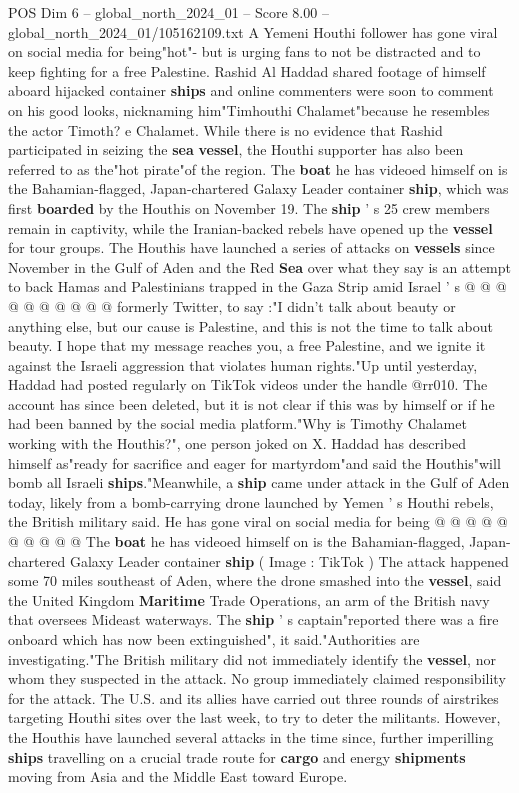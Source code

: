 \begin{textsample}{POS Dim 6 – global\_north\_2024\_01 – Score 8.00 – global\_north\_2024\_01/105162109.txt}  \label{ex:f6_pos_113}
A Yemeni Houthi follower has gone viral on social media for being"hot"- but is urging fans to not be distracted and to keep fighting for a free Palestine.
Rashid Al Haddad shared footage of himself aboard hijacked container \textbf{ships} and online commenters were soon to comment on his good looks, nicknaming him"Timhouthi Chalamet"because he resembles the actor Timoth? e Chalamet.
While there is no evidence that Rashid participated in seizing the \textbf{sea} \textbf{vessel}, the Houthi supporter has also been referred to as the"hot pirate"of the region.
The \textbf{boat} he has videoed himself on is the Bahamian-flagged, Japan-chartered Galaxy Leader container \textbf{ship}, which was first \textbf{boarded} by the Houthis on November 19.
The \textbf{ship} ' s 25 crew members remain in captivity, while the Iranian-backed rebels have opened up the \textbf{vessel} for tour groups.
The Houthis have launched a series of attacks on \textbf{vessels} since November in the Gulf of Aden and the Red \textbf{Sea} over what they say is an attempt to back Hamas and Palestinians trapped in the Gaza Strip amid Israel ' s @ @ @ @ @ @ @ @ @ @ formerly Twitter, to say :"I didn't talk about beauty or anything else, but our cause is Palestine, and this is not the time to talk about beauty.
I hope that my message reaches you, a free Palestine, and we ignite it against the Israeli aggression that violates human rights."Up until yesterday, Haddad had posted regularly on TikTok videos under the handle @rr010.
The account has since been deleted, but it is not clear if this was by himself or if he had been banned by the social media platform."Why is Timothy Chalamet working with the Houthis?", one person joked on X.
Haddad has described himself as"ready for sacrifice and eager for martyrdom"and said the Houthis"will bomb all Israeli \textbf{ships}."Meanwhile, a \textbf{ship} came under attack in the Gulf of Aden today, likely from a bomb-carrying drone launched by Yemen ' s Houthi rebels, the British military said.
He has gone viral on social media for being @ @ @ @ @ @ @ @ @ @ The \textbf{boat} he has videoed himself on is the Bahamian-flagged, Japan-chartered Galaxy Leader container \textbf{ship} ( Image : TikTok ) The attack happened some 70 miles southeast of Aden, where the drone smashed into the \textbf{vessel}, said the United Kingdom \textbf{Maritime} Trade Operations, an arm of the British navy that oversees Mideast waterways.
The \textbf{ship} ' s captain"reported there was a fire onboard which has now been extinguished", it said."Authorities are investigating."The British military did not immediately identify the \textbf{vessel}, nor whom they suspected in the attack.
No group immediately claimed responsibility for the attack.
The U.S. and its allies have carried out three rounds of airstrikes targeting Houthi sites over the last week, to try to deter the militants.
However, the Houthis have launched several attacks in the time since, further imperilling \textbf{ships} travelling on a crucial trade route for \textbf{cargo} and energy \textbf{shipments} moving from Asia and the Middle East toward Europe.


\end{textsample}
